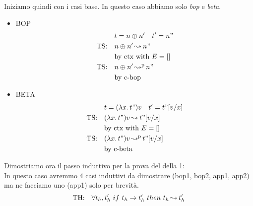\documentclass{article}
\begin{document}
Iniziamo quindi con i casi base. In questo caso abbiamo solo \textit{bop} e \textit{beta}.
\begin{itemize}
    \item BOP 
        \begin{align*}
            \quad & t = n\oplus n'\quad t'=n" \\
            \text{TS:}  \quad & n\oplus n' \operatorname{ \leadsto^{} } n" \\
            \quad & \text{by ctx with } E = [] \\
            \text {TS:} \quad & n\oplus n'\operatorname{ \leadsto^{p} } n" \\
            \quad & \text{by c-bop}
        \end{align*}
    \item BETA
        \begin{align*}
            \quad & t = (\lambda x\ldotp t")v\quad t'=t"[v/x] \\
            \text{TS:}  \quad & (\lambda x\ldotp t")v \operatorname{ \leadsto^{} } t"[v/x] \\
            \quad & \text{by ctx with } E = [] \\
            \text {TS:} \quad & (\lambda x\ldotp t")v \operatorname{ \leadsto^{p} } t"[v/x] \\
            \quad & \text{by c-beta}
        \end{align*}
\end{itemize}
Dimostriamo ora il passo induttivo per la prova del della 1: \\
In questo caso avremmo 4 casi induttivi da dimostrare (bop1, bop2, app1, app2) ma ne facciamo uno (app1) solo per brevità.
\[
    \text{TH:} \quad \forall t_h,t_h'\ if\ t_h\to t_h'\ then\ t_h\operatorname{ \leadsto^{} } t_h' \\
\]
\end{document}
